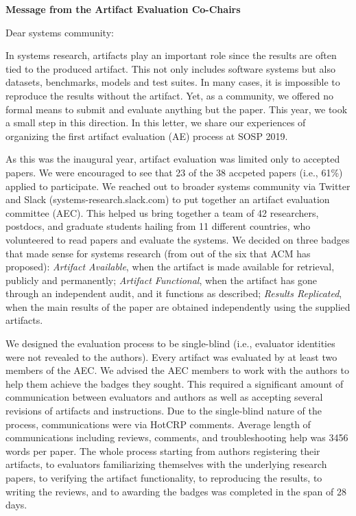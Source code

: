 \documentclass{letter}
\date{}
\begin{document}
\begin{letter}{\large \bf {Message from the Artifact Evaluation Co-Chairs}}
\opening{Dear systems community:}

In systems research, artifacts play an important role since the results are often tied to the produced artifact. This not only includes software systems but also datasets, benchmarks, models and test suites. In many cases, it is impossible to reproduce the results without the artifact. Yet, as a community, we offered no formal means to submit and evaluate anything but the paper. This year, we took a small step in this direction. In this letter, we share our experiences of organizing the first artifact evaluation (AE) process at SOSP 2019. 

As this was the inaugural year, artifact evaluation was limited only to accepted papers. We were encouraged to see that 23 of the 38 accpeted papers (i.e., 61\%) applied to participate. We reached out to broader systems community via Twitter and Slack (systems-research.slack.com) to put together an artifact evaluation committee (AEC). This helped us bring together a team of 42 researchers, postdocs, and graduate students hailing from 11 different countries, who volunteered to read papers and evaluate the systems. We decided on three badges that made sense for systems research (from out of the six that ACM has proposed): \emph{Artifact Available}, when the artifact is made available for retrieval, publicly and permanently; \emph{Artifact Functional}, when the artifact has gone through an independent audit, and it functions as described; \emph{Results Replicated}, when the main results of the paper are obtained independently using the supplied artifacts.

We designed the evaluation process to be single-blind (i.e., evaluator identities were not revealed to the authors). Every artifact was evaluated by at least two members of the AEC. We advised the AEC members to work with the authors to help them achieve the badges they sought. This required a significant amount of communication between evaluators and authors as well as accepting several revisions of artifacts and instructions. Due to the single-blind nature of the process, communications were via HotCRP comments. Average length of communications including reviews, comments, and troubleshooting help was 3456 words per paper. The whole process starting from authors registering their artifacts, to evaluators familiarizing themselves with the underlying research papers, to verifying the artifact functionality, to reproducing the results, to writing the reviews, and to awarding the badges was completed in the span of 28 days.


\end{letter}
\end{document}
